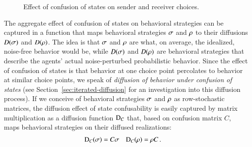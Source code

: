 \begin{figure}

  \caption{Effect of confusion of states on sender and receiver
    choices.}
  \label{fig:noise-perturbation-of-strategies}
\end{figure}

The aggregate effect of confusion of states on behavioral strategies
can be captured in a function that maps behavioral strategies
$\sigma$ and $\rho$ to their diffusions $D(\sigma)$ and
$D(\rho)$. The idea is that $\sigma$ and $\rho$ are what, on
average, the idealized, noise-free behavior would be, while
$D(\sigma)$ and $D(\rho)$ are behavioral strategies that describe
the agents' actual noise-perturbed probabilistic behavior. Since the
effect of confusion of states is that behavior at one choice point
percolates to behavior at similar choice points, we speak of
\emph{diffusion of behavior under confusion of states} (see
Section~\ref{sec:iterated-diffusion} for an investigation into this
diffusion process). If we conceive of behavioral strategies $\sigma$
and $\rho$ as row-stochastic matrices, the diffusion effect of
state confusability is easily captured by matrix multiplication as a
diffusion function $\mathrm{D}_C$ that, based on confusion matrix $C$, maps
behavioral strategies on their diffused realizations:
\begin{align}
  \label{eq:confusion-function}
  \mathrm{D}_C(\sigma) & = C \sigma &    \mathrm{D}_C(\rho) & = \rho C\,.
\end{align}



